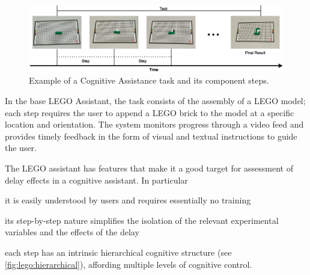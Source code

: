 \begin{figure}[h]
  \centering
  \includegraphics[width=.8\textwidth]{publications/2021ImpactDelayedResponse/Fig2.eps}
  \caption{Example of a Cognitive Assistance task and its component steps.}\label{fig:task:steps}
\end{figure}




In the base LEGO Assistant, the task consists of the assembly of a LEGO model; each step requires the user to append a LEGO brick to the model at a specific location and orientation.
The system monitors progress through a video feed and provides timely feedback in the form of visual and textual instructions to guide the user. 

The LEGO assistant has features that make it a good target for assessment of delay effects in a cognitive assistant.
In particular
\begin{enumerate*}[itemjoin={{, }},
                  itemjoin*={{, and }},
                  label={{(\arabic*)}}]
    \item it is easily understood by users and requires essentially no training
    \item its step-by-step nature simplifies the isolation of the relevant experimental variables and the effects of the delay
    \item each step has an intrinsic hierarchical cognitive structure (see \cref{fig:lego:hierarchical}), affording multiple levels of cognitive control. 
\end{enumerate*}

